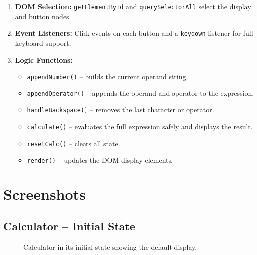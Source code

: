 \documentclass[12pt,a4paper]{article}
\begin{document}
\begin{enumerate}
  \item \textbf{DOM Selection:} \texttt{getElementById} and \texttt{querySelectorAll} select the display and button nodes.
  \item \textbf{Event Listeners:} Click events on each button and a \texttt{keydown} listener for full keyboard support.
  \item \textbf{Logic Functions:}
    \begin{itemize}
      \item \texttt{appendNumber()} -- builds the current operand string.
      \item \texttt{appendOperator()} -- appends the operand and operator to the expression.
      \item \texttt{handleBackspace()} -- removes the last character or operator.
      \item \texttt{calculate()} -- evaluates the full expression safely and displays the result.
      \item \texttt{resetCalc()} -- clears all state.
      \item \texttt{render()} -- updates the DOM display elements.
    \end{itemize}
\end{enumerate}

\section{Screenshots}

\subsection{Calculator -- Initial State}
\begin{figure}[h!]
  \centering
  \caption{Calculator in its initial state showing the default display.}
\end{figure}
\end{document}
